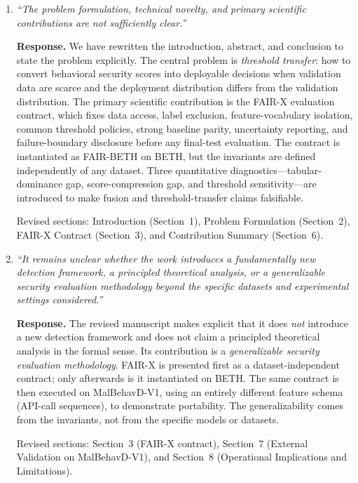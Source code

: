 \documentclass[11pt]{article}
\begin{document}
\begin{enumerate}[label=\textbf{Comment~\arabic*:},leftmargin=*,align=left]

\item \textit{``The problem formulation, technical novelty, and primary scientific contributions are not sufficiently clear.''}

\textbf{Response.} We have rewritten the introduction, abstract, and conclusion to state the problem explicitly. The central problem is \emph{threshold transfer}: how to convert behavioral security scores into deployable decisions when validation data are scarce and the deployment distribution differs from the validation distribution. The primary scientific contribution is the FAIR-X evaluation contract, which fixes data access, label exclusion, feature-vocabulary isolation, common threshold policies, strong baseline parity, uncertainty reporting, and failure-boundary disclosure before any final-test evaluation. The contract is instantiated as FAIR-BETH on BETH, but the invariants are defined independently of any dataset. Three quantitative diagnostics---tabular-dominance gap, score-compression gap, and threshold sensitivity---are introduced to make fusion and threshold-transfer claims falsifiable.

Revised sections: Introduction (Section~1), Problem Formulation (Section~2), FAIR-X Contract (Section~3), and Contribution Summary (Section~6).

\item \textit{``It remains unclear whether the work introduces a fundamentally new detection framework, a principled theoretical analysis, or a generalizable security evaluation methodology beyond the specific datasets and experimental settings considered.''}

\textbf{Response.} The revised manuscript makes explicit that it does \emph{not} introduce a new detection framework and does not claim a principled theoretical analysis in the formal sense. Its contribution is a \emph{generalizable security evaluation methodology}. FAIR-X is presented first as a dataset-independent contract; only afterwards is it instantiated on BETH. The same contract is then executed on MalBehavD-V1, using an entirely different feature schema (API-call sequences), to demonstrate portability. The generalizability comes from the invariants, not from the specific models or datasets.

Revised sections: Section~3 (FAIR-X contract), Section~7 (External Validation on MalBehavD-V1), and Section~8 (Operational Implications and Limitations).


\end{enumerate}
\end{document}
